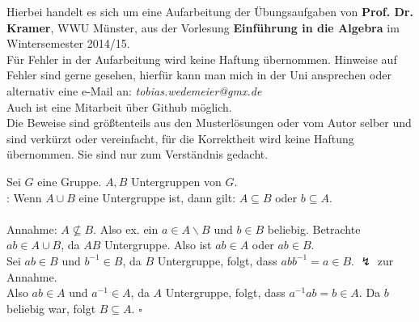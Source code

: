 \maketitle
\thispagestyle{empty}
\newpage
	
\thispagestyle{empty}
\vspace*{\fill}
\begin{center}
	Hierbei handelt es sich um eine Aufarbeitung der Übungsaufgaben von \textbf{Prof. Dr. Kramer}, WWU Münster, aus der Vorlesung \textbf{Einführung in die Algebra} im Wintersemester 2014/15.\\
	\vspace{2cm}
	Für Fehler in der Aufarbeitung wird keine Haftung übernommen. Hinweise auf Fehler sind gerne gesehen, hierfür kann man mich in der Uni ansprechen oder alternativ eine e-Mail an: \textit{tobias.wedemeier@gmx.de}\\
	Auch ist eine Mitarbeit über Github möglich.\\
	\vspace{2cm}
	Die Beweise sind größtenteils aus den Musterlösungen oder vom Autor selber und sind verkürzt oder vereinfacht, für die Korrektheit wird keine Haftung übernommen. Sie sind nur zum Verständnis gedacht.
\end{center}
\vspace*{\fill}
\newpage
	
	
\tableofcontents
\cleardoubleoddemptypage %
	
\setcounter{page}{1}


\label{sub:zettel_1alg}
Sei $G$ eine Gruppe. $A,B$ Untergruppen von $G$.\\
\zz: Wenn $A\cup B$ eine Untergruppe ist, dann gilt: $A\subseteq B$ oder $b\subseteq A$.\\

\\
Annahme: $A\not\subseteq B$. Also ex. ein $a\in A\backslash B$ und $b\in B$ beliebig. Betrachte $ab\in A\cup B$, da $AB$ Untergruppe. Also ist $ab\in A$ oder $ab\in B$.\\
Sei $ab\in B$ und $b^{-1}\in B$, da $B$ Untergruppe, folgt, dass $abb^{-1}=a\in B$. $\lightning$ zur Annahme.\\
Also $ab\in A$ und $a^{-1}\in A$, da $A$ Untergruppe, folgt, dass $a^{-1}ab=b\in A$. Da $b$ beliebig war, folgt $B\subseteq A$.
\hfill $\square$

